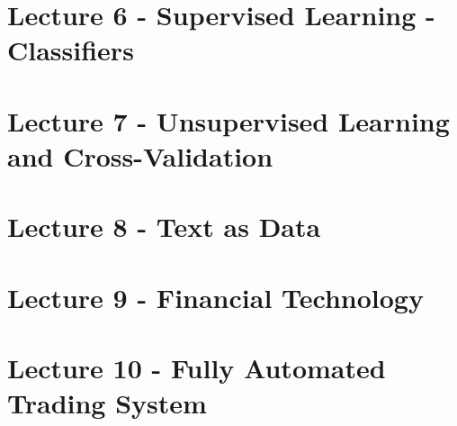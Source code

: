 \documentclass[11pt,a4paper]{report}
\begin{document}
\chapter{Lecture 6 - Supervised Learning - Classifiers}
\chapter{Lecture 7 - Unsupervised Learning and Cross-Validation}
\chapter{Lecture 8 - Text as Data}
\chapter{Lecture 9 - Financial Technology}
\chapter{Lecture 10 - Fully Automated Trading System}
\end{document}
